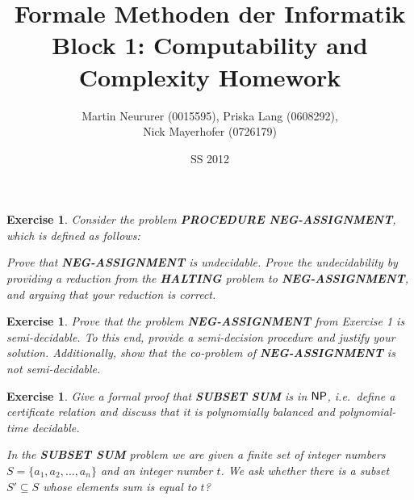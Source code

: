 \documentclass[11pt]{article}
\newtheorem{exercise}[theorem]{Exercise}
\newcommand{\ccfont}[1]{\protect\mathsf{#1}}
\newcommand{\NP}{\ccfont{NP}}
\begin{document}
\title{Formale Methoden der Informatik \\
Block 1: Computability and Complexity Homework}
\author{Martin Neururer (0015595), Priska Lang (0608292), \\Nick Mayerhofer (0726179)}
\date{SS 2012}
\maketitle


\begin{exercise}
  Consider the problem \textbf{PROCEDURE NEG-ASSIGNMENT}, which is defined
  as follows:

  \begin{center}
  \end{center}
  Prove that \textbf{NEG-ASSIGNMENT} is undecidable. Prove the undecidability
  by providing a reduction from the \textbf{HALTING} problem to
  \textbf{NEG-ASSIGNMENT}, and arguing that your reduction is correct.
\end{exercise}


%

\begin{exercise}
  Prove that the problem \textbf{NEG-ASSIGNMENT} from Exercise 1 is semi-decidable. 
To this end, provide a semi-decision procedure and justify your solution. Additionally,  show that the co-problem of \textbf{NEG-ASSIGNMENT} is not semi-decidable.
\end{exercise}



%

\begin{exercise}
  Give a formal proof that \textbf{SUBSET SUM} is in $\NP$, i.e.\, define a
  certificate relation and discuss that it is polynomially balanced and
  polynomial-time decidable.
  
   \smallskip
    
  \noindent In the \textbf{SUBSET SUM} problem we are given a finite set of integer numbers $S=\{a_1, a_2, \ldots, a_n\}$ and an integer number $t$. We ask whether there is a subset $S'\subseteq S$ whose elements sum is equal to $t$?
  
\end{exercise}
\end{document}
